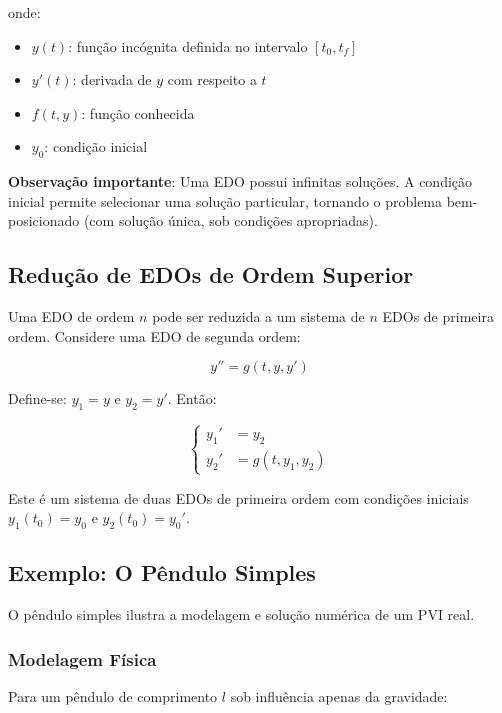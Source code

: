 \documentclass[12pt,a4paper]{article}
\begin{document}
onde:
\begin{itemize}
    \item $y(t)$: função incógnita definida no intervalo $[t_0, t_f]$
    \item $y'(t)$: derivada de $y$ com respeito a $t$
    \item $f(t, y)$: função conhecida
    \item $y_0$: condição inicial
\end{itemize}

\textbf{Observação importante}: Uma EDO possui infinitas soluções. A condição inicial permite selecionar uma solução particular, tornando o problema bem-posicionado (com solução única, sob condições apropriadas).

\subsection{Redução de EDOs de Ordem Superior}

Uma EDO de ordem $n$ pode ser reduzida a um sistema de $n$ EDOs de primeira ordem. Considere uma EDO de segunda ordem:

\begin{equation}
y'' = g(t, y, y')
\end{equation}

Define-se: $y_1 = y$ e $y_2 = y'$. Então:

\begin{equation}
\left\{\begin{aligned}
y_1' &= y_2 \\
y_2' &= g(t, y_1, y_2)
\end{aligned}\right.
\end{equation}

Este é um sistema de duas EDOs de primeira ordem com condições iniciais $y_1(t_0) = y_0$ e $y_2(t_0) = y_0'$.

\subsection{Exemplo: O Pêndulo Simples}

O pêndulo simples ilustra a modelagem e solução numérica de um PVI real.

\subsubsection{Modelagem Física}

Para um pêndulo de comprimento $l$ sob influência apenas da gravidade:
\end{document}
